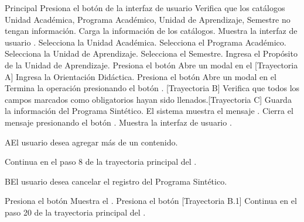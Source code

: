 \begin{UCtrayectoria}{Principal}
    \UCpaso[\UCactor] Presiona el botón  de la interfaz de usuario  
    \UCpaso Verifica que los catálogos Unidad Académica, Programa Académico, Unidad de Aprendizaje, Semestre no tengan información.
    \UCpaso Carga la información de los catálogos.
    \UCpaso Muestra la interfaz de usuario .
    \UCpaso[\UCactor] Selecciona la Unidad Académica.
    \UCpaso[\UCactor] Selecciona el Programa Académico.
    \UCpaso[\UCactor] Selecciona la Unidad de Aprendizaje.
    \UCpaso[\UCactor] Selecciona el Semestre.
    \UCpaso[\UCactor] Ingresa el Propósito de la Unidad de Aprendizaje.
    \UCpaso[\UCactor] Presiona el botón 
    \UCpaso Abre un modal en el  [Trayectoria A]
    \UCpaso[\UCactor] Ingresa la Orientación Didáctica.
    \UCpaso[\UCactor] Presiona el botón 
    \UCpaso Abre un modal en el 
    \UCpaso[\UCactor] Termina la operación presionando el botón . [Trayectoria B]
    \UCpaso Verifica que todos los campos marcados como obligatorios hayan sido llenados.[Trayectoria C]
    \UCpaso Guarda la información del Programa Sintético.
    \UCpaso El sistema muestra el mensaje .
    \UCpaso[\UCactor] Cierra el mensaje presionando el botón .
    \UCpaso Muestra la interfaz de usuario .
\end{UCtrayectoria}


\begin{UCtrayectoriaA}{A}{El usuario desea agregar más de un contenido.}

    \UCpaso Continua en el paso 8 de la trayectoria principal del .

\end{UCtrayectoriaA}

\begin{UCtrayectoriaA}{B}{El usuario desea cancelar el registro del Programa Sintético.}

    \UCpaso[\UCactor] Presiona el botón 
    \UCpaso Muestra el .
    \UCpaso[\UCactor] Presiona el botón  [Trayectoria B.1]
    \UCpaso Continua en el paso 20 de la trayectoria principal del .

\end{UCtrayectoriaA}

